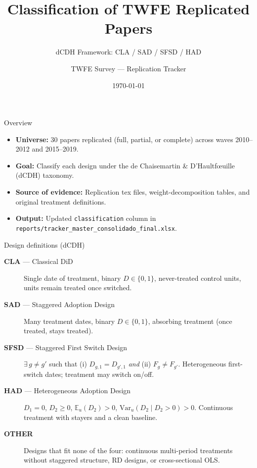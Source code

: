 \documentclass[10pt,aspectratio=169]{beamer}
\title[TWFE Design Classification]{Classification of TWFE Replicated Papers}
\subtitle{dCDH Framework: CLA / SAD / SFSD / HAD}
\author{TWFE Survey --- Replication Tracker}
\date{\today}
\begin{document}
\begin{frame}
\titlepage
\end{frame}

\begin{frame}{Overview}
\begin{itemize}
  \item \textbf{Universe:} 30 papers replicated (full, partial, or complete) across waves 2010--2012 and 2015--2019.
  \item \textbf{Goal:} Classify each design under the de Chaisemartin \& D'Haultf\oe uille (dCDH) taxonomy.
  \item \textbf{Source of evidence:} Replication tex files, weight-decomposition tables, and original treatment definitions.
  \item \textbf{Output:} Updated \texttt{classification} column in \\
    \texttt{reports/tracker\_master\_consolidado\_final.xlsx}.
\end{itemize}
\end{frame}

\begin{frame}{Design definitions (dCDH)}
\small
\begin{description}
  \item[\textcolor{claColor}{\textbf{CLA}} --- Classical DiD]
    Single date of treatment, binary $D \in \{0,1\}$, never-treated control units, units remain treated once switched.
  \item[\textcolor{sadColor}{\textbf{SAD}} --- Staggered Adoption Design]
    Many treatment dates, binary $D \in \{0,1\}$, absorbing treatment (once treated, stays treated).
  \item[\textcolor{sfsdColor}{\textbf{SFSD}} --- Staggered First Switch Design]
    $\exists\, g \ne g'$ such that (i) $D_{g,1} = D_{g',1}$ \emph{and} (ii) $F_g \ne F_{g'}$.
    Heterogeneous first-switch dates; treatment may switch on/off.
  \item[\textcolor{hadColor}{\textbf{HAD}} --- Heterogeneous Adoption Design]
    $D_1 = 0$, $D_2 \ge 0$, $\mathbb{E}_u(D_2) > 0$, $\mathrm{Var}_u(D_2 \mid D_2 > 0) > 0$.
    Continuous treatment with stayers and a clean baseline.
  \item[\textcolor{otherColor}{\textbf{OTHER}}]
    Designs that fit none of the four: continuous multi-period treatments without staggered structure, RD designs, or cross-sectional OLS.
\end{description}
\end{frame}
\end{document}
